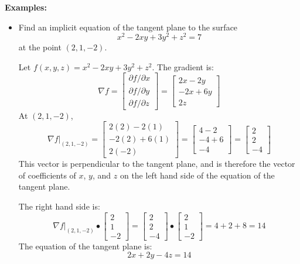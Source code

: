 \documentclass{article}
\begin{document}
\textbf{Examples:}
\begin{itemize}
\item Find an implicit equation of the tangent plane to the surface 
\[x^2 - 2xy + 3y^2 + z^2 = 7\]
at the point \((2,1,-2)\). 

Let \(f(x,y,z) = x^2 - 2xy + 3y^2 + z^2\). The gradient is:
\[\nabla f = \begin{bmatrix} \partial f/\partial x \\ \partial f /\partial y \\ \partial f/\partial z \end{bmatrix} = \begin{bmatrix} 2x - 2y \\ -2x + 6y \\ 2z \end{bmatrix}\]
At \((2, 1, -2)\), 
\[\nabla f\Big|_{(2, 1, -2)} = \begin{bmatrix} 2(2) - 2(1) \\ -2(2) + 6(1) \\ 2(-2) \end{bmatrix} = \begin{bmatrix} 4 - 2 \\ -4 + 6 \\ -4 \end{bmatrix} = \begin{bmatrix} 2 \\ 2 \\ -4 \end{bmatrix}\]
This vector is perpendicular to the tangent plane, and is therefore the vector of coefficients of \(x\), \(y\), and \(z\) on the left hand side of the equation of the tangent plane.

The right hand side is: 
\[\nabla f\Big|_{(2, 1, -2)} \bullet \begin{bmatrix} 2 \\ 1 \\ -2 \end{bmatrix} = \begin{bmatrix} 2 \\ 2 \\ -4 \end{bmatrix} \bullet \begin{bmatrix} 2 \\ 1 \\ -2 \end{bmatrix} = 4 + 2 + 8 = 14\]
The equation of the tangent plane is:
\[2x + 2y - 4z = 14\]
\end{itemize}  
\end{document}
